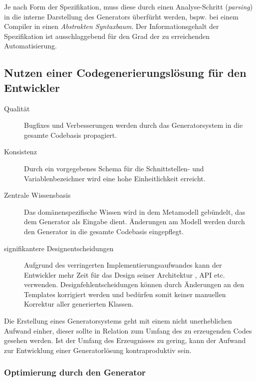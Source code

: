 Je nach Form der Spezifikation, muss diese durch einen Analyse-Schritt (\emph{parsing}) in die interne Darstellung des Generators überfürht werden, bspw. bei einem Compiler in einen \emph{Abstrakten Syntaxbaum}.
Der Informationsgehalt der Spezifikation ist ausschlaggebend für den Grad der zu erreichenden Automatisierung.

\subsection{Nutzen einer Codegenerierungslösung für den Entwickler\cite{herrington2003code}}

\begin{description}
    \item[Qualität]
        Bugfixes und Verbesserungen werden durch das Generatorsystem in die gesamte Codebasis propagiert.
    \item[Konsistenz]
        Durch ein vorgegebenes Schema für die Schnittstellen- und Variablenbezeichner wird eine hohe Einheitlichkeit erreicht.
    \item[Zentrale Wissensbasis]
        Das domänenspezifische Wissen wird in dem Metamodell gebündelt, das dem Generator als Eingabe dient. Änderungen am Modell werden durch den Generator in die gesamte Codebasis eingepflegt.
    \item[signifikantere Designentscheidungen]
        Aufgrund des verringerten Implementierungsaufwandes kann der Entwickler mehr Zeit für das Design seiner Architektur , API etc. verwenden. Designfehlentscheidungen können durch Änderungen an den Templates korrigiert werden und bedürfen somit keiner manuellen Korrektur aller generierten Klassen.
\end{description}

Die Erstellung eines Generatorsystems geht mit einem nicht unerheblichen Aufwand einher, dieser sollte in Relation zum Umfang des zu erzeugenden Codes gesehen werden.
Ist der Umfang des Erzeugnisses zu gering, kann der Aufwand zur Entwicklung einer Generatorlösung kontraproduktiv sein.

\subsubsection{Optimierung durch den Generator}

